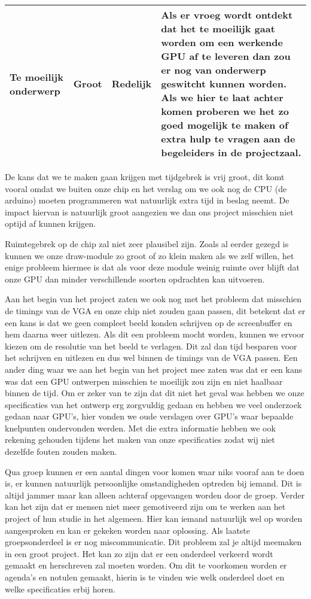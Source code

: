\documentclass{scrartcl} %
\begin{document}
\begin{table}[H]
\begin{tabular}{|p{}|l|l|p{}|}
		\hline
		Te moeilijk onderwerp	& Groot	& Redelijk	& Als er vroeg wordt ontdekt dat het te moeilijk gaat worden om een werkende GPU af te leveren dan zou er nog van onderwerp geswitcht kunnen worden. Als we hier te laat achter komen proberen we het zo goed mogelijk te maken of extra hulp te vragen aan de begeleiders in de projectzaal.\\
		\hline
	\end{tabular}
\end{table}

De kans dat we te maken gaan krijgen met tijdgebrek is vrij groot, dit komt vooral omdat we buiten onze chip en het verslag om we ook nog de CPU (de arduino) moeten programmeren wat natuurlijk extra tijd in beslag neemt. De impact hiervan is natuurlijk groot aangezien we dan ons project misschien niet optijd af kunnen krijgen.

Ruimtegebrek op de chip zal niet zeer plausibel zijn. Zoals al eerder gezegd is kunnen we onze draw-module zo groot of zo klein maken als we zelf willen, het enige probleem hiermee is dat als voor deze module weinig ruimte over blijft dat onze GPU dan minder verschillende soorten opdrachten kan uitvoeren.

Aan het begin van het project zaten we ook nog met het probleem dat misschien de timings van de VGA en onze chip niet zouden gaan passen, dit betekent dat er een kans is dat we geen compleet beeld konden schrijven op de screenbuffer en hem daarna weer uitlezen. Als dit een probleem mocht worden, kunnen we ervoor kiezen om de resolutie van het beeld te verlagen. Dit zal dan tijd besparen voor het schrijven en uitlezen en dus wel binnen de timings van de VGA passen. Een ander ding waar we aan het begin van het project mee zaten was dat er een kans was dat een GPU ontwerpen misschien te moeilijk zou zijn en niet haalbaar binnen de tijd. Om er zeker van te zijn dat dit niet het geval was hebben we onze specificaties van het ontwerp erg zorgvuldig gedaan en hebben we veel onderzoek gedaan naar GPU's, hier vonden we oude verslagen over GPU's waar bepaalde knelpunten ondervonden werden. Met die extra informatie hebben we ook rekening gehouden tijdens het maken van onze specificaties zodat wij niet dezelfde fouten zouden maken.

Qua groep kunnen er een aantal dingen voor komen waar niks vooraf aan te doen is, er kunnen natuurlijk persoonlijke omstandigheden optreden bij iemand. Dit is altijd jammer maar kan alleen achteraf opgevangen worden door de groep. Verder kan het zijn dat er mensen niet meer gemotiveerd zijn om te werken aan het project of hun studie in het algemeen. Hier kan iemand natuurlijk wel op worden aangesproken en kan er gekeken worden naar oplossing. Als laatste groepsonderdeel is er nog miscommunicatie. Dit probleem zal je altijd meemaken in een groot project. Het kan zo zijn dat er een onderdeel verkeerd wordt gemaakt en herschreven zal moeten worden. Om dit te voorkomen worden er agenda's en notulen gemaakt, hierin is te vinden wie welk onderdeel doet en welke specificaties erbij horen.
\end{document}

